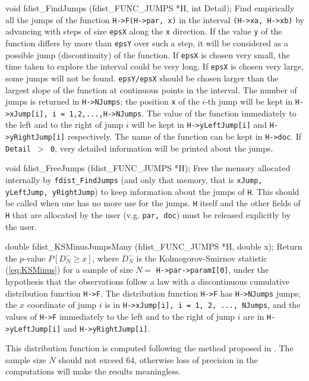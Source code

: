 void fdist_FindJumps (fdist_FUNC_JUMPS *H, int Detail);
\endcode
 \tab
   Find empirically all the jumps of the function  {\tt H->F(H->par, x)}
   in the interval  {\tt (H->xa, H->xb)} by advancing with steps of size 
   {\tt epsX} along the  {\tt x} direction. If the value {\tt y} of the
   function differs by more than  {\tt epsY} over such a step, it will be
   considered as a possible jump (discontinuity) of the function.
   If {\tt epsX} is chosen very small, the time taken to explore the
   interval could be very long. If {\tt epsX} is chosen very large, some
   jumps will not be found.
   {\tt epsY/epsX} should be chosen larger than the largest
   slope of the function at continuous points in the interval.
   The number of jumps is returned in  {\tt H->NJumps}; the position
   {\tt x} of the $i$-th jump will be kept in 
   {\tt H->xJump[i], i = 1,2,...,H->NJumps}.
   The value of the function  immediately to the left and to the right
   of jump $i$ will be kept in {\tt H->yLeftJump[i]} and 
   {\tt H->yRightJump[i]} respectively. The name of the function can be
   kept in {\tt H->doc}.
   If {\tt Detail $>$ 0}, very detailed information will be printed about
   the jumps.
 \endtab
\code


void fdist_FreeJumps (fdist_FUNC_JUMPS *H);
\endcode
 \tab
  Free the memory allocated internally by {\tt fdist\_FindJumps} (and only
  that memory, that is {\tt xJump, yLeftJump, yRightJump})
  to keep information about the jumps of {\tt H}.
  This should be called when one has no more use for the jumps. {\tt H}
  itself and the other fields of {\tt H} that are allocated by
  the user  (v.g. {\tt par, doc}) must be released explicitly by the user. 
 \endtab
\code


double fdist_KSMinusJumpsMany (fdist_FUNC_JUMPS *H, double x);
\endcode
 \tab  
  Return the $p$-value $P[D_{\!N}^- \ge x]$, where $D_{\!N}^-$ is the
  Kolmogorov-Smirnov statistic (\ref{eq:KSMinus}) for a sample of size
  $N =$  {\tt H->par->paramI[0]}, under
  the hypothesis that the observations follow a  law with a discontinuous
  cumulative distribution function  {\tt H->F}. The distribution function
  {\tt H->F} has {\tt H->NJumps} jumps;  the $x$ coordinate of jump $i$
  is in {\tt H->xJump[i], i = 1, 2, ..., NJumps}, and the values of {\tt H->F}
  immediately to the left and to the right of jump $i$ are in 
  {\tt H->yLeftJump[i]} and {\tt H->yRightJump[i]}.

  This distribution function is computed following the method
  proposed in \cite{tCON72a}. The sample size  $N$ should not exceed
  64, otherwise loss of precision in the computations
  will make the results meaningless.
  \endtab
\code


